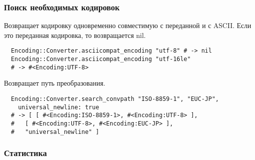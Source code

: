 \subsubsection*{Поиск необходимых кодировок}

\begin{methodlist}
  Возвращает кодировку одновременно совместимую с переданной и с ASCII. Если это переданная кодировка, то возвращается nil.
  \begin{verbatim}
  Encoding::Converter.asciicompat_encoding "utf-8" # -> nil 
  Encoding::Converter.asciicompat_encoding "utf-16le" 
  # -> #<Encoding:UTF-8>
  \end{verbatim}

  Возвращает путь преобразования.
  \begin{verbatim}
  Encoding::Converter.search_convpath "ISO-8859-1", "EUC-JP",
    universal_newline: true 
  # -> [ [ #<Encoding:ISO-8859-1>, #<Encoding:UTF-8> ],
  #   [ #<Encoding:UTF-8>, #<Encoding:EUC-JP> ],
  #   "universal_newline" ]
  \end{verbatim}
\end{methodlist}

\subsubsection*{Статистика}

